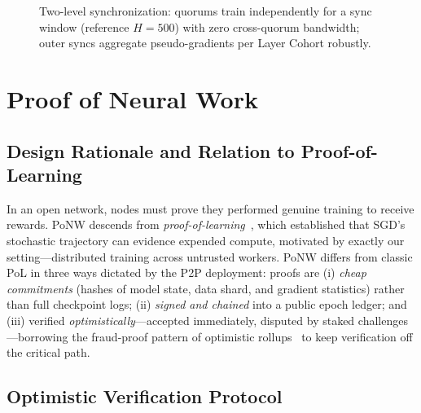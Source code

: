 \documentclass[conference]{IEEEtran}
\begin{document}
\begin{figure}[t]
\caption{Two-level synchronization: quorums train independently for a sync window (reference $H{=}500$) with zero cross-quorum bandwidth; outer syncs aggregate pseudo-gradients per Layer Cohort robustly.}
\label{fig:diloco-timeline}
\end{figure}

\section{Proof of Neural Work}
\label{sec:ponw}

\subsection{Design Rationale and Relation to Proof-of-Learning}

In an open network, nodes must prove they performed genuine training to receive rewards. PoNW descends from \emph{proof-of-learning}~\cite{jia2021proof}, which established that SGD's stochastic trajectory can evidence expended compute, motivated by exactly our setting---distributed training across untrusted workers. PoNW differs from classic PoL in three ways dictated by the P2P deployment: proofs are (i) \emph{cheap commitments} (hashes of model state, data shard, and gradient statistics) rather than full checkpoint logs; (ii) \emph{signed and chained} into a public epoch ledger; and (iii) verified \emph{optimistically}---accepted immediately, disputed by staked challenges---borrowing the fraud-proof pattern of optimistic rollups~\cite{kalodner2018arbitrum} to keep verification off the critical path.

\subsection{Optimistic Verification Protocol}
\end{document}
